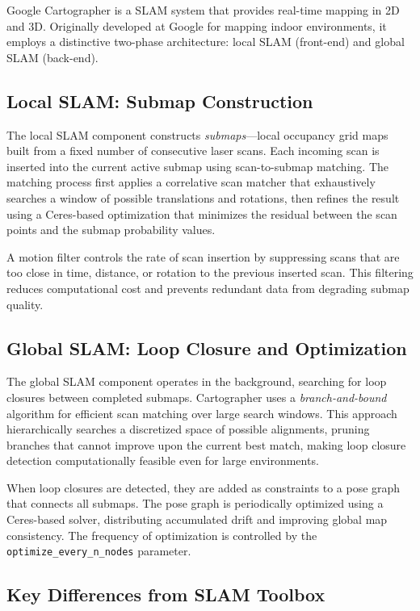 Google Cartographer \citep{hess2016cartographer} is a SLAM system that provides real-time mapping in 2D and 3D. Originally developed at Google for mapping indoor environments, it employs a distinctive two-phase architecture: local SLAM (front-end) and global SLAM (back-end).

\subsection{Local SLAM: Submap Construction}

The local SLAM component constructs \emph{submaps}---local occupancy grid maps built from a fixed number of consecutive laser scans. Each incoming scan is inserted into the current active submap using scan-to-submap matching. The matching process first applies a correlative scan matcher that exhaustively searches a window of possible translations and rotations, then refines the result using a Ceres-based optimization that minimizes the residual between the scan points and the submap probability values.

A motion filter controls the rate of scan insertion by suppressing scans that are too close in time, distance, or rotation to the previous inserted scan. This filtering reduces computational cost and prevents redundant data from degrading submap quality.

\subsection{Global SLAM: Loop Closure and Optimization}

The global SLAM component operates in the background, searching for loop closures between completed submaps. Cartographer uses a \emph{branch-and-bound} algorithm for efficient scan matching over large search windows. This approach hierarchically searches a discretized space of possible alignments, pruning branches that cannot improve upon the current best match, making loop closure detection computationally feasible even for large environments.

When loop closures are detected, they are added as constraints to a pose graph that connects all submaps. The pose graph is periodically optimized using a Ceres-based solver, distributing accumulated drift and improving global map consistency. The frequency of optimization is controlled by the \texttt{optimize\_every\_n\_nodes} parameter.

\subsection{Key Differences from SLAM Toolbox}

